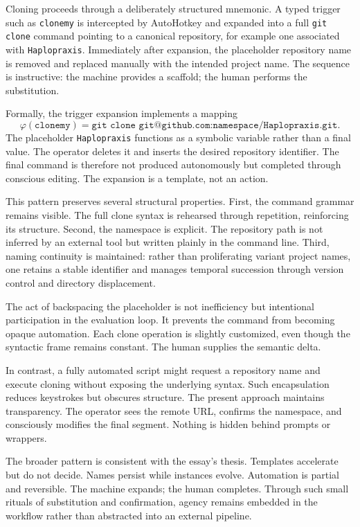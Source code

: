 \documentclass[11pt]{article}
\begin{document}
Cloning proceeds through a deliberately structured mnemonic. A typed trigger such as \texttt{clonemy} is intercepted by AutoHotkey and expanded into a full \texttt{git clone} command pointing to a canonical repository, for example one associated with \texttt{Haplopraxis}. Immediately after expansion, the placeholder repository name is removed and replaced manually with the intended project name. The sequence is instructive: the machine provides a scaffold; the human performs the substitution.

Formally, the trigger expansion implements a mapping
\[
\varphi(\texttt{clonemy}) = \texttt{git clone git@github.com:namespace/Haplopraxis.git}.
\]
The placeholder \texttt{Haplopraxis} functions as a symbolic variable rather than a final value. The operator deletes it and inserts the desired repository identifier. The final command is therefore not produced autonomously but completed through conscious editing. The expansion is a template, not an action.

This pattern preserves several structural properties. First, the command grammar remains visible. The full clone syntax is rehearsed through repetition, reinforcing its structure. Second, the namespace is explicit. The repository path is not inferred by an external tool but written plainly in the command line. Third, naming continuity is maintained: rather than proliferating variant project names, one retains a stable identifier and manages temporal succession through version control and directory displacement.

The act of backspacing the placeholder is not inefficiency but intentional participation in the evaluation loop. It prevents the command from becoming opaque automation. Each clone operation is slightly customized, even though the syntactic frame remains constant. The human supplies the semantic delta.

In contrast, a fully automated script might request a repository name and execute cloning without exposing the underlying syntax. Such encapsulation reduces keystrokes but obscures structure. The present approach maintains transparency. The operator sees the remote URL, confirms the namespace, and consciously modifies the final segment. Nothing is hidden behind prompts or wrappers.

The broader pattern is consistent with the essay’s thesis. Templates accelerate but do not decide. Names persist while instances evolve. Automation is partial and reversible. The machine expands; the human completes. Through such small rituals of substitution and confirmation, agency remains embedded in the workflow rather than abstracted into an external pipeline.
\end{document}
